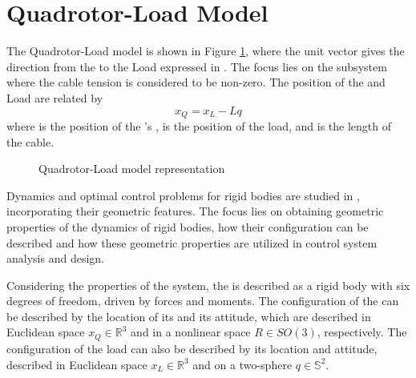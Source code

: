 \section{Quadrotor-Load Model}	\label{sec:mod.QRLmod}
The Quadrotor-Load model is shown in Figure \ref{fig:QRLmodel}, where the unit vector  gives the direction from the  to the Load expressed in \BF. The focus lies on the subsystem where the cable tension is considered to be non-zero. The position of the  and Load are related by
\begin{equation}\label{eq:mod.xQ2xL}
x_Q=x_L-Lq
\end{equation}
where  is the position of the 's ,  is the position of the load, and  is the length of the cable.

\begin{figure}[h!]
	\centering
	\caption{Quadrotor-Load model representation\label{fig:QRLmodel}}
\end{figure}		

Dynamics and optimal control problems for rigid bodies are studied in \cite{Lee2008}, incorporating their geometric features. The focus lies on obtaining geometric properties of the dynamics of rigid bodies, how their configuration can be described and how these geometric properties are utilized in control system analysis and design. 

Considering the properties of the system, the  is described as a rigid body with six degrees of freedom, driven by forces and moments. 
The configuration of the  can be described by the location of its  and its attitude, which are described in Euclidean space $x_Q\in \mathbb{R}^3 $ and in a nonlinear space $R\in SO(3) $, respectively. 
The configuration of the load can also be described by its location and attitude, described in Euclidean space $x_L\in \mathbb{R}^3 $ and on a two-sphere $ q\in \mathbb{S}^2 $.


